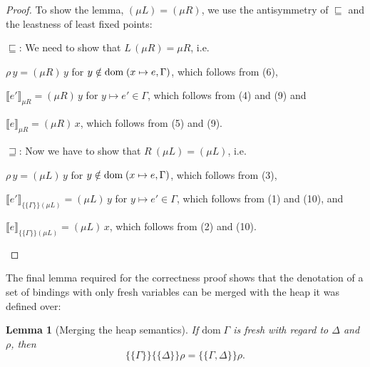 \documentclass{jfp1}
\newtheorem{lemma}{Lemma}
\theoremstyle{nonumberbreak}
\newtheorem{proof}{Proof}
\newcommand{\dom}[1]{\text{dom}\;#1}
\newcommand{\dsem}[2]{\llbracket #1 \rrbracket_{#2}}
\newcommand{\esem}[1]{\{\!\!\!\{#1\}\!\!\!\}}
\begin{document}
\begin{proof}
To show the lemma, $(\mu L) = (\mu R)$, we use the antisymmetry of $\sqsubseteq$ and the leastness of least fixed points:
\begin{compactitem}[$\sqsubseteq$:]
\item[$\sqsubseteq$:] We need to show that $L\, (\mu R) = \mu R$, i.e.
\begin{compactitem}
\item $\rho\,y = (\mu R)\, y$ for $y \notin \domxG$, which follows from (6),
\item $\dsem{e'}{\mu R} = (\mu R)\, y$ for $y \mapsto e' \in \Gamma$, which follows from (4) and (9) and
\item $\dsem{e}{\mu R} = (\mu R)\, x$, which follows from (5) and (9).
\end{compactitem}
\item[$\sqsupseteq$:] Now we have to show that $R\ (\mu L) = (\mu L)$, i.e.
\begin{compactitem}
\item $\rho\,y = (\mu L)\, y$ for $y \notin \domxG$, which follows from (3),
\item $\dsem{e'}{\esem{\Gamma}{(\mu L)}} = (\mu L)\, y$ for $y \mapsto e' \in \Gamma$, which follows from (1) and (10), and
\item $\dsem{e}{\esem{\Gamma}{(\mu L)}} = (\mu L)\, x$, which follows from (2) and (10).
\end{compactitem}
\end{compactitem}
\end{proof}

The final lemma required for the correctness proof shows that the denotation of a set of bindings with only fresh variables can be merged with the heap it was defined over:

\begin{lemma}[Merging the heap semantics]
\label{lem_esem-merge}
If $\dom \Gamma$ is fresh with regard to $\Delta$ and $\rho$, then
\[
\esem{\Gamma}{\esem{\Delta}\rho} = \esem{\Gamma, \Delta}\rho.
\]
\end{lemma}
\end{document}
